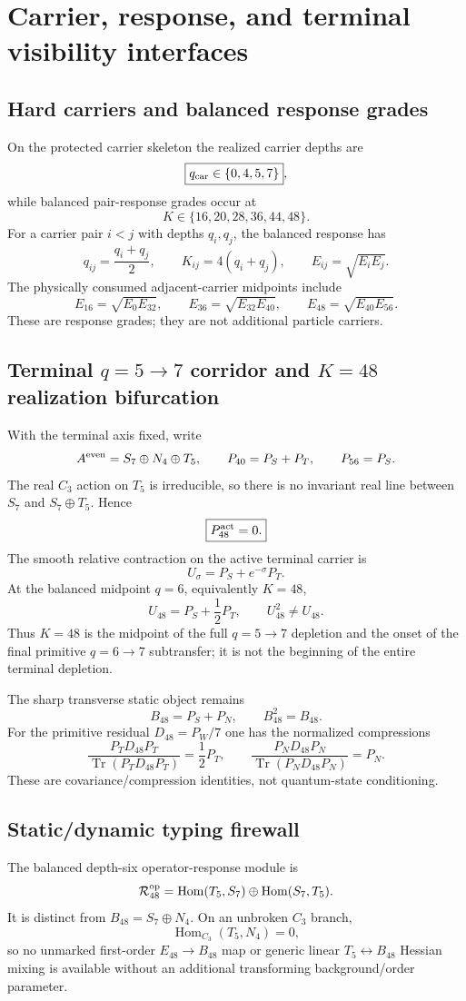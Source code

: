 \documentclass[12pt,a4paper]{article}
\begin{document}
\section{Carrier, response, and terminal visibility interfaces}
\label{p3c:sec:v184-carrier-response-terminal-midpoint}

\subsection{Hard carriers and balanced response grades}
On the protected carrier skeleton the realized carrier depths are
\[
  \boxed{q_{\rm car}\in\{0,4,5,7\}},
\]
while balanced pair-response grades occur at
\[
  \boxed{K\in\{16,20,28,36,44,48\}}.
\]
For a carrier pair $i<j$ with depths $q_i,q_j$, the balanced response has
\[
 q_{ij}=\frac{q_i+q_j}{2},\qquad K_{ij}=4(q_i+q_j),\qquad
 E_{ij}=\sqrt{E_iE_j}.
\]
The physically consumed adjacent-carrier midpoints include
\[
 E_{16}=\sqrt{E_0E_{32}},\qquad
 E_{36}=\sqrt{E_{32}E_{40}},\qquad
 E_{48}=\sqrt{E_{40}E_{56}}.
\]
These are response grades; they are not additional particle carriers.

\subsection{Terminal $q=5\to7$ corridor and $K=48$ realization bifurcation}
With the terminal axis fixed, write
\[
 A^{\rm even}=S_7\oplus N_4\oplus T_5,
 \qquad P_{40}=P_S+P_T,\qquad P_{56}=P_S.
\]
The real $C_3$ action on $T_5$ is irreducible, so there is no invariant real
line between $S_7$ and $S_7\oplus T_5$.  Hence
\[
 \boxed{P_{48}^{\rm act}=0.}
\]
The smooth relative contraction on the active terminal carrier is
\[
 U_\sigma=P_S+e^{-\sigma}P_T.
\]
At the balanced midpoint $q=6$, equivalently $K=48$,
\[
 \boxed{U_{48}=P_S+\frac12P_T,\qquad U_{48}^2\ne U_{48}.}
\]
Thus $K=48$ is the midpoint of the full $q=5\to7$ depletion and the onset of
the final primitive $q=6\to7$ subtransfer; it is not the beginning of the
entire terminal depletion.

The sharp transverse static object remains
\[
 \boxed{B_{48}=P_S+P_N,\qquad B_{48}^2=B_{48}.}
\]
For the primitive residual $D_{48}=P_W/7$ one has the normalized compressions
\[
 \frac{P_TD_{48}P_T}{\operatorname{Tr}(P_TD_{48}P_T)}=\frac12P_T,
 \qquad
 \frac{P_ND_{48}P_N}{\operatorname{Tr}(P_ND_{48}P_N)}=P_N.
\]
These are covariance/compression identities, not quantum-state conditioning.

\subsection{Static/dynamic typing firewall}
The balanced depth-six operator-response module is
\[
 \mathcal R_{48}^{\rm op}
 =\operatorname{Hom}(T_5,S_7)\oplus\operatorname{Hom}(S_7,T_5).
\]
It is distinct from $B_{48}=S_7\oplus N_4$.  On an unbroken $C_3$ branch,
\[
 \boxed{\operatorname{Hom}_{C_3}(T_5,N_4)=0,}
\]
so no unmarked first-order $E_{48}\to B_{48}$ map or generic linear
$T_5\leftrightarrow B_{48}$ Hessian mixing is available without an additional
transforming background/order parameter.
\end{document}
